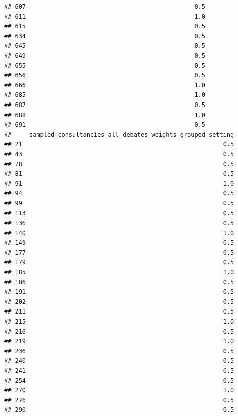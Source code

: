 \documentclass[
]{article}
\begin{document}
\begin{verbatim}
## 607                                               0.5
## 611                                               1.0
## 615                                               0.5
## 634                                               0.5
## 645                                               0.5
## 649                                               0.5
## 655                                               0.5
## 656                                               0.5
## 666                                               1.0
## 685                                               1.0
## 687                                               0.5
## 688                                               1.0
## 691                                               0.5
##     sampled_consultancies_all_debates_weights_grouped_setting
## 21                                                        0.5
## 43                                                        0.5
## 78                                                        0.5
## 81                                                        0.5
## 91                                                        1.0
## 94                                                        0.5
## 99                                                        0.5
## 113                                                       0.5
## 136                                                       0.5
## 140                                                       1.0
## 149                                                       0.5
## 177                                                       0.5
## 179                                                       0.5
## 185                                                       1.0
## 186                                                       0.5
## 191                                                       0.5
## 202                                                       0.5
## 211                                                       0.5
## 215                                                       1.0
## 216                                                       0.5
## 219                                                       1.0
## 236                                                       0.5
## 240                                                       0.5
## 241                                                       0.5
## 254                                                       0.5
## 270                                                       1.0
## 276                                                       0.5
## 290                                                       0.5

\end{verbatim}
\end{document}
